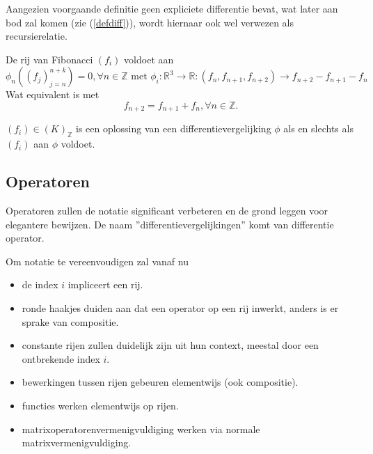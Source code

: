 \documentclass[a4paper,12pt]{article}
\begin{document}
\begin{remark}
    Aangezien voorgaande definitie geen expliciete differentie bevat, wat later aan bod zal komen
    (zie (\ref{defdiff})), wordt hiernaar ook wel verwezen als recursierelatie.
\end{remark}

\begin{example}[Fibonacci]
    De rij van Fibonacci $(f_i)$ voldoet aan
    $$
        \phi_n((f_j)_{j = n}^{n+k}) = 0, \forall n \in \mathbb{Z} \text{ met } \phi_i:\mathbb{R}^{3} \rightarrow \mathbb{R}:(f_n,f_{n+1},f_{n+2}) \rightarrow f_{n+2}-f_{n+1}-f_n
    $$
    Wat equivalent is met
    $$
        f_{n+2} = f_{n+1}+f_{n}, \forall n \in \mathbb{Z}.
    $$


\end{example}

\begin{definition}
    $(f_i) \in (K)_{\mathbb{Z}}$ is een oplossing van een differentievergelijking $\phi$
    als en slechts als $(f_i)$ aan $\phi$ voldoet.
\end{definition}



\subsection{Operatoren}
Operatoren zullen de notatie significant verbeteren en de grond leggen voor elegantere bewijzen. De naam
''differentievergelijkingen'' komt van differentie operator.


\begin{notation}
    \label{notoperatoren}
    Om notatie te vereenvoudigen zal vanaf nu
    \begin{itemize}
        \item de index $i$ impliceert een rij.
        \item ronde haakjes duiden aan dat een operator op een rij inwerkt, anders is er sprake van compositie.
        \item constante rijen zullen duidelijk zijn uit hun context, meestal door een ontbrekende index $i$.
        \item bewerkingen tussen rijen gebeuren elementwijs (ook compositie).
        \item functies werken elementwijs op rijen.
        \item matrixoperatorenvermenigvuldiging werken via normale matrixvermenigvuldiging.
    \end{itemize}

\end{notation}
\end{document}
